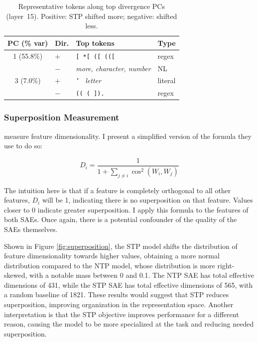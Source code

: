 \documentclass[11pt]{article}
\begin{document}
\begin{table}[t]
\centering
\small
\setlength{\tabcolsep}{4pt}
\begin{tabular}{@{}clll@{}}
\toprule
\textbf{PC (\% var)} & \textbf{Dir.} & \textbf{Top tokens} & \textbf{Type} \\
\midrule
1 (55.8\%) & $+$ & \texttt{[ \; *[ \; ([ \; (([} & regex \\
             & $-$ & \emph{more, character, number} & NL \\
\midrule
3 (7.0\%)   & $+$ & \texttt{' \;} \emph{letter} & literal \\
             & $-$ & \texttt{(( \; ( \; ]).} & regex \\
\bottomrule
\end{tabular}
\caption{Representative tokens along top divergence PCs (layer~15). Positive: STP shifted more; negative: shifted less.}
\label{tab:subspace-tokens}
\end{table}

\subsubsection{Superposition Measurement}

\citet{elhage2022superposition} measure feature dimensionality. I present a simplified version of the formula they use to do so:

\begin{equation}
D_i = \frac{1}{1 + \displaystyle\sum_{j \neq i} \cos^2(W_i, W_j)}
\end{equation}

The intuition here is that if a feature is completely orthogonal to all other features, $D_i$ will be 1, indicating there is no superposition on that feature. Values closer to 0 indicate greater superposition. I apply this formula to the features of both SAEs. Once again, there is a potential confounder of the quality of the SAEs themselves.

Shown in Figure \ref{fig:superposition}, the STP model shifts the distribution of feature dimensionality towards higher values, obtaining a more normal distribution compared to the NTP model, whose distribution is more right-skewed, with a notable mass between 0 and 0.1. The NTP SAE has total effective dimensions of 431, while the STP SAE has total effective dimensions of 565, with a random baseline of 1821. These results would suggest that STP reduces superposition, improving organization in the representation space. Another interpretation is that the STP objective improves performance for a different reason, causing the model to be more specialized at the task and reducing needed superposition.
\end{document}
